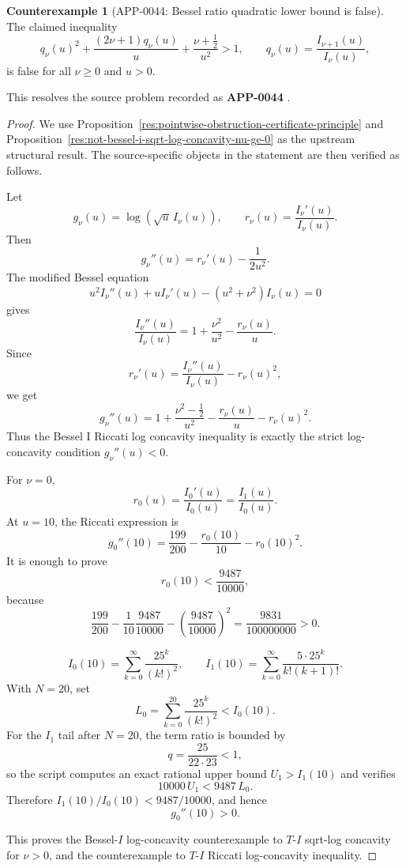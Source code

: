 \documentclass[11pt]{article}
\numberwithin{equation}{section}
\theoremstyle{definition}
\newtheorem{counterexample}[theorem]{Counterexample}
\theoremstyle{remark}
\newcommand{\1}{\mathbf 1}
\begin{document}
\begin{counterexample}[APP-0044: Bessel ratio quadratic lower bound is false]
\label{res:not-bessel-i-ratio-quadratic-bound}
The claimed inequality
\[
q_\nu(u)^2+\frac{(2\nu+1)q_\nu(u)}{u}+\frac{\nu+\frac12}{u^2}>1,
\qquad q_\nu(u)=\frac{I_{\nu+1}(u)}{I_\nu(u)},
\]
is false for all \(\nu\ge0\) and \(u>0\).



This resolves the source problem recorded as \textbf{APP-0044} \cite{app-app-0042-source}.
\end{counterexample}

\begin{proof}
We use Proposition~\ref{res:pointwise-obstruction-certificate-principle} and Proposition~\ref{res:not-bessel-i-sqrt-log-concavity-nu-ge-0} as the upstream structural result. The source-specific objects in the statement are then verified as follows.

Let
\[
g_\nu(u)=\log(\sqrt u\,I_\nu(u)),
\qquad
r_\nu(u)=\frac{I_\nu'(u)}{I_\nu(u)}.
\]
Then
\[
g_\nu''(u)=r_\nu'(u)-\frac{1}{2u^2}.
\]
The modified Bessel equation
\[
u^2I_\nu''(u)+uI_\nu'(u)-(u^2+\nu^2)I_\nu(u)=0
\]
gives
\[
\frac{I_\nu''(u)}{I_\nu(u)}
=1+\frac{\nu^2}{u^2}-\frac{r_\nu(u)}{u}.
\]
Since
\[
r_\nu'(u)=\frac{I_\nu''(u)}{I_\nu(u)}-r_\nu(u)^2,
\]
we get
\[
g_\nu''(u)
=
1+\frac{\nu^2-\frac12}{u^2}
-\frac{r_\nu(u)}{u}
-r_\nu(u)^2.
\]
Thus the Bessel I Riccati log concavity inequality is exactly the strict log-concavity condition \(g_\nu''(u)<0\).

For \(\nu=0\),
\[
r_0(u)=\frac{I_0'(u)}{I_0(u)}=\frac{I_1(u)}{I_0(u)}.
\]
At \(u=10\), the Riccati expression is
\[
g_0''(10)=\frac{199}{200}-\frac{r_0(10)}{10}-r_0(10)^2.
\]
It is enough to prove
\[
r_0(10)<\frac{9487}{10000},
\]
because
\[
\frac{199}{200}
-\frac{1}{10}\frac{9487}{10000}
-\left(\frac{9487}{10000}\right)^2
=\frac{9831}{100000000}>0.
\]

\[
I_0(10)=\sum_{k=0}^{\infty}\frac{25^k}{(k!)^2},
\qquad
I_1(10)=\sum_{k=0}^{\infty}\frac{5\cdot25^k}{k!(k+1)!}.
\]
With \(N=20\), set
\[
L_0=\sum_{k=0}^{20}\frac{25^k}{(k!)^2}<I_0(10).
\]
For the \(I_1\) tail after \(N=20\), the term ratio is bounded by
\[
q=\frac{25}{22\cdot23}<1,
\]
so the script computes an exact rational upper bound \(U_1>I_1(10)\) and verifies
\[
10000\,U_1<9487\,L_0.
\]
Therefore \(I_1(10)/I_0(10)<9487/10000\), and hence
\[
g_0''(10)>0.
\]

This proves the Bessel-\(I\) log-concavity counterexample to \(T\)-\(I\) sqrt-log concavity for \(\nu>0\), and the counterexample to \(T\)-\(I\) Riccati log-concavity inequality.
\end{proof}
\end{document}
